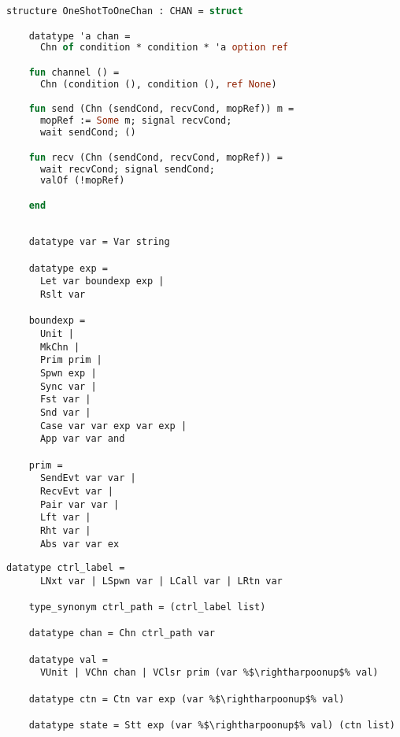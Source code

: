 \documentclass{article}
\begin{document}
\begin{lstlisting}[language=ML, style=codestyle1]
  structure OneShotToOneChan : CHAN = struct

    datatype 'a chan =
      Chn of condition * condition * 'a option ref

    fun channel () =
      Chn (condition (), condition (), ref None)

    fun send (Chn (sendCond, recvCond, mopRef)) m =
      mopRef := Some m; signal recvCond;  
      wait sendCond; ()

    fun recv (Chn (sendCond, recvCond, mopRef)) =
      wait recvCond; signal sendCond;
      valOf (!mopRef)

    end
  \end{lstlisting}

  \begin{lstlisting}[style=codestyle1]

    datatype var = Var string

    datatype exp = 
      Let var boundexp exp |
      Rslt var

    boundexp =
      Unit |
      MkChn |
      Prim prim |
      Spwn exp |
      Sync var |
      Fst var |
      Snd var |
      Case var var exp var exp |
      App var var and

    prim = 
      SendEvt var var |
      RecvEvt var |
      Pair var var |
      Lft var |
      Rht var |
      Abs var var ex

  \end{lstlisting}


  \begin{lstlisting}[style=codestyle1, escapechar=\%]
    datatype ctrl_label = 
      LNxt var | LSpwn var | LCall var | LRtn var

    type_synonym ctrl_path = (ctrl_label list)

    datatype chan = Chn ctrl_path var

    datatype val = 
      VUnit | VChn chan | VClsr prim (var %$\rightharpoonup$% val)

    datatype ctn = Ctn var exp (var %$\rightharpoonup$% val)  

    datatype state = Stt exp (var %$\rightharpoonup$% val) (ctn list) 

    \end{lstlisting}
\end{document}
